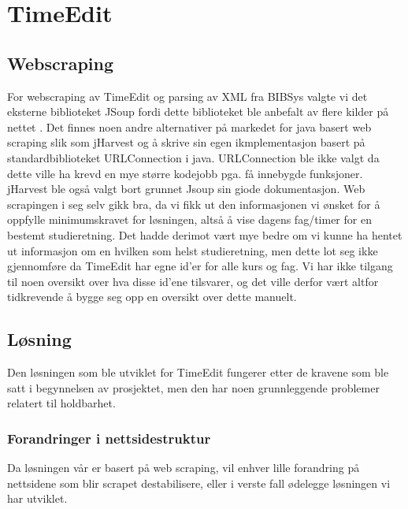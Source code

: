 \documentclass[../main.tex]{subfiles}
\begin{document}
\section{TimeEdit}

\subsection{Webscraping}

For webscraping av TimeEdit og parsing av XML fra BIBSys valgte vi det eksterne biblioteket JSoup fordi dette biblioteket ble anbefalt av flere kilder på nettet   . Det finnes noen andre alternativer på markedet for java basert web scraping slik som jHarvest og å skrive sin egen ikmplementasjon basert på standardbiblioteket URLConnection i java. URLConnection ble ikke valgt da dette ville ha krevd en mye større kodejobb pga. få innebygde funksjoner. jHarvest ble også valgt bort grunnet Jsoup sin giode dokumentasjon. \newline
Web scrapingen i seg selv gikk bra, da vi fikk ut den informasjonen vi ønsket for å oppfylle minimumskravet for løsningen, altså å vise dagens fag/timer for en bestemt studieretning. Det hadde derimot vært mye bedre om vi kunne ha hentet ut informasjon om en hvilken som helst studieretning, men dette lot seg ikke gjennomføre da TimeEdit har egne id’er for alle kurs og fag. Vi har ikke tilgang til noen oversikt over hva disse id’ene tilsvarer, og det ville derfor vært altfor tidkrevende å bygge seg opp en oversikt over dette manuelt.

\subsection{Løsning}

Den løsningen som ble utviklet for TimeEdit fungerer etter de kravene som ble satt i begynnelsen av prosjektet, men den har noen grunnleggende problemer relatert til holdbarhet.

\subsubsection{Forandringer i nettsidestruktur}

Da løsningen vår er basert på web scraping, vil enhver lille forandring på nettsidene som blir scrapet destabilisere, eller i verste fall ødelegge løsningen vi har utviklet. 
\end{document}
